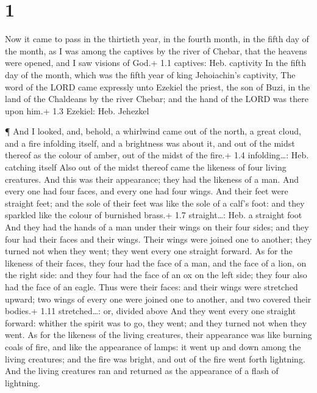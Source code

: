 \hypertarget{section}{%
\section{1}\label{section}}

 Now it came to pass in the thirtieth year, in the fourth
month, in the fifth day of the month, as I was among the captives by the
river of Chebar, that the heavens were opened, and I saw visions of
God.+ 1.1 captives: Heb. captivity  In the fifth day of the
month, which was the fifth year of king Jehoiachin's captivity,
 The word of the LORD came expressly unto Ezekiel the
priest, the son of Buzi, in the land of the Chaldeans by the river
Chebar; and the hand of the LORD was there upon him.+ 1.3 Ezekiel: Heb.
Jehezkel

 ¶ And I looked, and, behold, a whirlwind came out of the
north, a great cloud, and a fire infolding itself, and a brightness was
about it, and out of the midst thereof as the colour of amber, out of
the midst of the fire.+ 1.4 infolding\ldots: Heb. catching itself
 Also out of the midst thereof came the likeness of four
living creatures. And this was their appearance; they had the likeness
of a man.  And every one had four faces, and every one had
four wings.  And their feet were straight feet; and the sole
of their feet was like the sole of a calf's foot: and they sparkled like
the colour of burnished brass.+ 1.7 straight\ldots: Heb. a straight foot
 And they had the hands of a man under their wings on their
four sides; and they four had their faces and their wings. 
Their wings were joined one to another; they turned not when they went;
they went every one straight forward.  As for the likeness
of their faces, they four had the face of a man, and the face of a lion,
on the right side: and they four had the face of an ox on the left side;
they four also had the face of an eagle.  Thus were their
faces: and their wings were stretched upward; two wings of every one
were joined one to another, and two covered their bodies.+ 1.11
stretched\ldots: or, divided above  And they went every one
straight forward: whither the spirit was to go, they went; and they
turned not when they went.  As for the likeness of the
living creatures, their appearance was like burning coals of fire, and
like the appearance of lamps: it went up and down among the living
creatures; and the fire was bright, and out of the fire went forth
lightning.  And the living creatures ran and returned as
the appearance of a flash of lightning.

